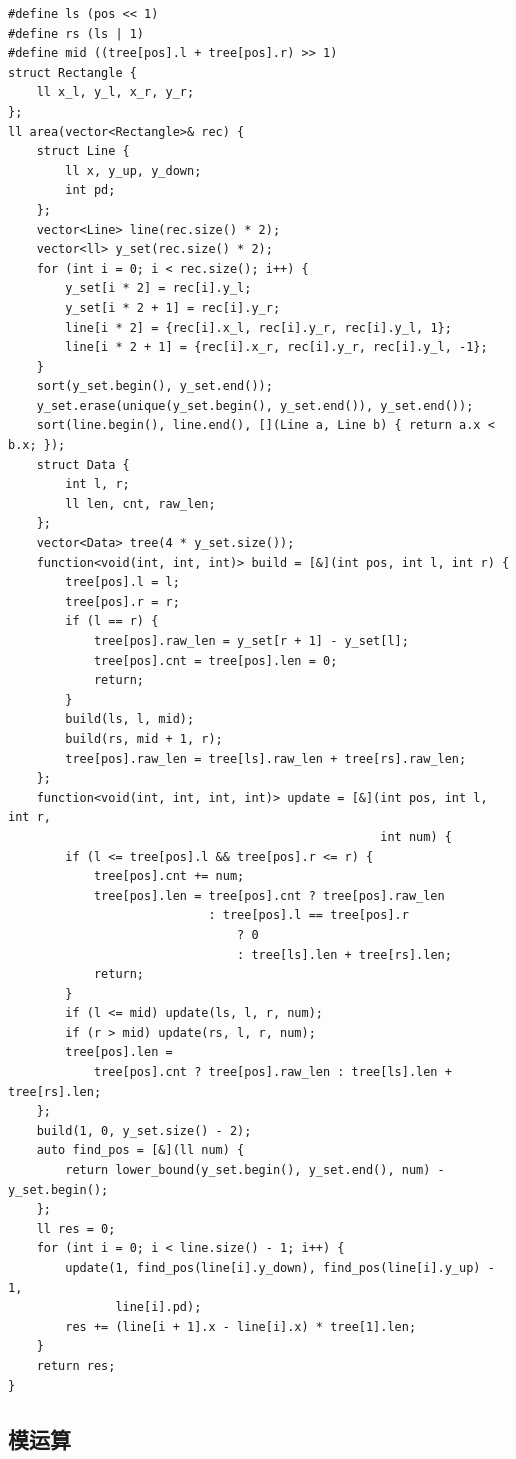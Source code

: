 \documentclass[UTF8]{ctexart}
\begin{document}
\begin{sloppypar}
\begin{lstlisting}[style=cpp]
#define ls (pos << 1)
#define rs (ls | 1)
#define mid ((tree[pos].l + tree[pos].r) >> 1)
struct Rectangle {
    ll x_l, y_l, x_r, y_r;
};
ll area(vector<Rectangle>& rec) {
    struct Line {
        ll x, y_up, y_down;
        int pd;
    };
    vector<Line> line(rec.size() * 2);
    vector<ll> y_set(rec.size() * 2);
    for (int i = 0; i < rec.size(); i++) {
        y_set[i * 2] = rec[i].y_l;
        y_set[i * 2 + 1] = rec[i].y_r;
        line[i * 2] = {rec[i].x_l, rec[i].y_r, rec[i].y_l, 1};
        line[i * 2 + 1] = {rec[i].x_r, rec[i].y_r, rec[i].y_l, -1};
    }
    sort(y_set.begin(), y_set.end());
    y_set.erase(unique(y_set.begin(), y_set.end()), y_set.end());
    sort(line.begin(), line.end(), [](Line a, Line b) { return a.x < b.x; });
    struct Data {
        int l, r;
        ll len, cnt, raw_len;
    };
    vector<Data> tree(4 * y_set.size());
    function<void(int, int, int)> build = [&](int pos, int l, int r) {
        tree[pos].l = l;
        tree[pos].r = r;
        if (l == r) {
            tree[pos].raw_len = y_set[r + 1] - y_set[l];
            tree[pos].cnt = tree[pos].len = 0;
            return;
        }
        build(ls, l, mid);
        build(rs, mid + 1, r);
        tree[pos].raw_len = tree[ls].raw_len + tree[rs].raw_len;
    };
    function<void(int, int, int, int)> update = [&](int pos, int l, int r,
                                                    int num) {
        if (l <= tree[pos].l && tree[pos].r <= r) {
            tree[pos].cnt += num;
            tree[pos].len = tree[pos].cnt ? tree[pos].raw_len
                            : tree[pos].l == tree[pos].r
                                ? 0
                                : tree[ls].len + tree[rs].len;
            return;
        }
        if (l <= mid) update(ls, l, r, num);
        if (r > mid) update(rs, l, r, num);
        tree[pos].len =
            tree[pos].cnt ? tree[pos].raw_len : tree[ls].len + tree[rs].len;
    };
    build(1, 0, y_set.size() - 2);
    auto find_pos = [&](ll num) {
        return lower_bound(y_set.begin(), y_set.end(), num) - y_set.begin();
    };
    ll res = 0;
    for (int i = 0; i < line.size() - 1; i++) {
        update(1, find_pos(line[i].y_down), find_pos(line[i].y_up) - 1,
               line[i].pd);
        res += (line[i + 1].x - line[i].x) * tree[1].len;
    }
    return res;
}
\end{lstlisting}

\subsection{模运算}


\end{sloppypar}
\end{document}

